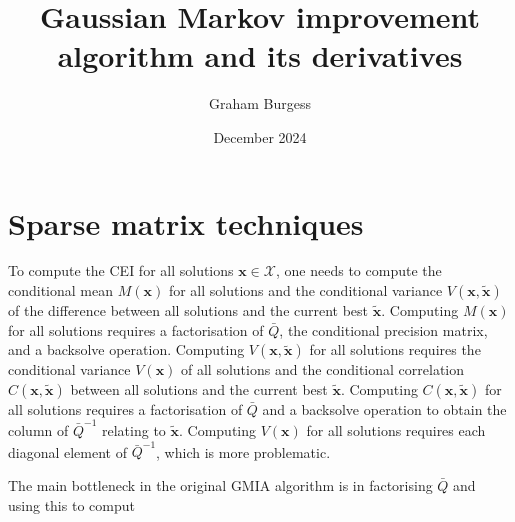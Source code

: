 \message{ !name(GMIA.tex)}\documentclass[12pt,a4paper]{article}
\title{Gaussian Markov improvement algorithm and its derivatives}
\author{Graham Burgess}
\date{December 2024}
\begin{document}

%
\maketitle

\section{Sparse matrix techniques}

To compute the CEI for all solutions $\boldsymbol{x} \in \mathcal{X}$, one needs to compute the conditional mean $M(\boldsymbol{x})$ for all solutions and the conditional variance $V(\boldsymbol{x},\tilde{\boldsymbol{x}})$ of the difference between all solutions and the current best $\tilde{\boldsymbol{x}}$. Computing $M(\boldsymbol{x})$ for all solutions requires a factorisation of $\bar{Q}$, the conditional precision matrix, and a backsolve operation. Computing $V(\boldsymbol{x},\tilde{\boldsymbol{x}})$ for all solutions requires the conditional variance $V(\boldsymbol{x})$ of all solutions and the conditional correlation $C(\boldsymbol{x},\tilde{\boldsymbol{x}})$ between all solutions and the current best $\tilde{\boldsymbol{x}}$. Computing $C(\boldsymbol{x},\tilde{\boldsymbol{x}})$ for all solutions requires a factorisation of $\bar{Q}$ and a backsolve operation to obtain the column of $\bar{Q}^{-1}$ relating to $\tilde{\boldsymbol{x}}$. Computing $V(\boldsymbol{x})$ for all solutions requires each diagonal element of $\bar{Q}^{-1}$, which is more problematic. 

The main bottleneck in the original GMIA algorithm is in factorising $\bar{Q}$ and using this to comput

\newpage



\end{document}
